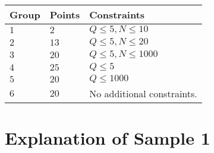 \noindent
\begin{tabular}{| l | l | p{12cm} |}
  \hline
  \textbf{Group} & \textbf{Points} & \textbf{Constraints} \\ \hline
  $1$    & $2$        & $Q \leq 5, N \leq 10$ \\ \hline
  $2$    & $13$       & $Q \leq 5, N \leq 20$ \\ \hline
  $3$    & $20$       & $Q \leq 5, N \leq 1000$ \\ \hline
  $4$    & $25$       & $Q \leq 5$ \\ \hline
  $5$    & $20$       & $Q \leq 1000$ \\ \hline
  $6$    & $20$       & No additional constraints. \\ \hline
\end{tabular}

\section*{Explanation of Sample 1}

